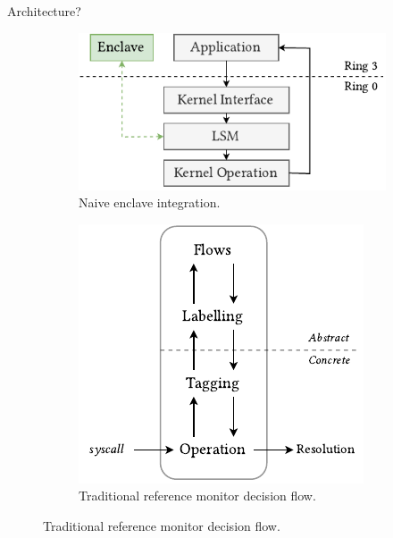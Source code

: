 \documentclass[xcolor=dvipsnames]{beamer}
\begin{document}
\begin{frame}{Architecture?}

    \begin{figure}
        \centering
        \begin{subfigure}{.5\textwidth}
          \centering
          \includegraphics[width=.9\linewidth]{../figures/SGX-EnclaveIntegration.pdf}
          \vspace{5mm}
          \caption{Naive enclave integration.}
          \label{fig:sub1}
        \end{subfigure}%
        \begin{subfigure}{.5\textwidth}
          \centering
          \includegraphics[width=.85\linewidth]{../figures/IFCFlow-1.pdf}
          \vspace{5mm}
          \caption{Traditional reference monitor decision flow.}
          \label{fig:sub2}
        \end{subfigure}
        \label{fig:test}
    \end{figure}

    
\end{frame}
\end{document}
